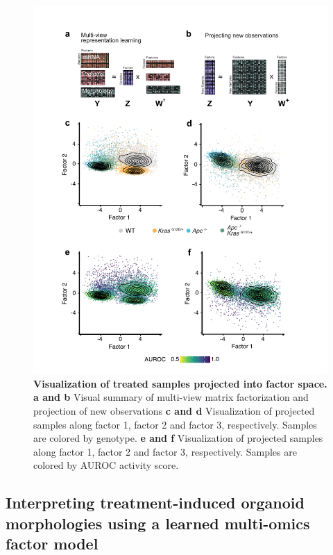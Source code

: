 \begin{flushleft}
\begin{figure}[h]
\centering
\includegraphics[scale=0.75,
                keepaspectratio]{figures/adenomaprofiling/pdf/fig_5_0.pdf}
\caption[Visualization of treated samples projected into factor space]{\textbf{Visualization of treated samples projected into factor space. a and b} Visual summary of multi-view matrix factorization and projection of new observations \textbf{c and d} Visualization of projected samples along factor 1, factor 2 and factor 3, respectively. Samples are colored by genotype. \textbf{e and f} Visualization of projected samples along factor 1, factor 2 and factor 3, respectively. Samples are colored by AUROC activity score.}
\label{fig_500}
\end{figure}
\bigbreak




\clearpage
\subsection{Interpreting treatment-induced organoid morphologies using a learned multi-omics factor model}


\end{flushleft}
